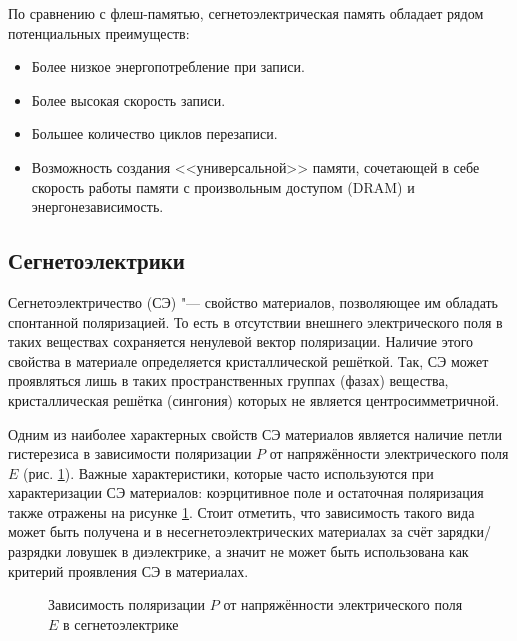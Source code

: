 \noindent По сравнению с флеш-памятью, сегнетоэлектрическая память обладает рядом потенциальных преимуществ:
\begin{itemize}
    \item Более низкое энергопотребление при записи.
    \item Более высокая скорость записи.
    \item Большее количество циклов перезаписи.
    \item Возможность создания <<универсальной>> памяти, сочетающей в себе скорость работы памяти с произвольным доступом (DRAM) и энергонезависимость.
\end{itemize}

\subsection{Сегнетоэлектрики}
Сегнетоэлектричество (СЭ) "--- свойство материалов, позволяющее им обладать спонтанной поляризацией. То есть в отсутствии внешнего электрического поля в таких веществах сохраняется ненулевой вектор поляризации. Наличие этого свойства в материале определяется кристаллической решёткой. Так, СЭ может проявляться лишь в таких пространственных группах (фазах) вещества, кристаллическая решётка (сингония) которых не является центросимметричной.

Одним из наиболее характерных свойств СЭ материалов является наличие петли гистерезиса в зависимости поляризации \(P\) от напряжённости электрического поля \(E\) (рис. \cref{fig:hysteresis}). Важные характеристики, которые часто используются при характеризации СЭ материалов: коэрцитивное поле и остаточная поляризация также отражены на рисунке \cref{fig:hysteresis}. Стоит отметить, что зависимость такого вида может быть получена и в несегнетоэлектрических материалах за счёт зарядки/разрядки ловушек в диэлектрике, а значит не может быть использована как критерий проявления СЭ в материалах.

\begin{figure}[ht]
    \caption{Зависимость поляризации \(P\) от напряжённости электрического поля \(E\) в сегнетоэлектрике}\label{fig:hysteresis}
\end{figure}

